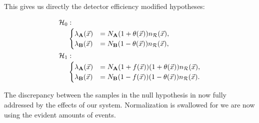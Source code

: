 \documentclass[paper/ddppaper2.tex]{subfiles}
\begin{document}
This gives us directly the detector efficiency modified hypotheses:

\begin{equation}
\begin{aligned}
    {{\mathcal{H}_{0}}} &:\\[-0.5ex]
    &\begin{cases}
        {{\lambda}_{{\mathbf{A}}}(\vec{{x}})}
        &=
        N_{{\mathbf{A}}}
        (1 + {\theta}(\vec{{x}})) n_{\mathcal{R}}({\vec{{x}}}),
        \\
        {{\lambda}_{{\mathbf{B}}}(\vec{{x}})}
        &=
        N_{{\mathbf{B}}}
        (1 - {\theta}(\vec{{x}}))n_{\mathcal{R}}({\vec{{x}}}),
    \end{cases} \\
    {\mathcal{H}_{1}} &:\\[-0.5ex]
    &\begin{cases}
        {{\lambda}_{{\mathbf{A}}}(\vec{{x}})}
        &=
        N_{{\mathbf{A}}}
        (1 + f(\vec{{x}})) (1 + {\theta}(\vec{{x}}))n_{\mathcal{R}}({\vec{{x}}}),
        \\
        {{\lambda}_{{\mathbf{B}}}(\vec{{x}})}
        &=
        N_{{\mathbf{B}}}
        (1 - f(\vec{{x}})) (1 - {\theta}(\vec{{x}}))n_{\mathcal{R}}({\vec{{x}}}).
    \end{cases}
\end{aligned}
\end{equation}

The discrepancy between the samples in the null hypothesis in now fully addressed by the effects of our system. Normalization is swallowed for we are now using the evident amounts of events.

\iftrue %
\par\medskip{}\medskip
\fi %
\end{document}
